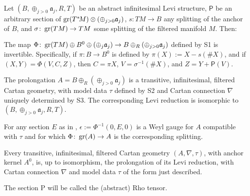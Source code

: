 \documentclass[leqno,12pt]{amsart} %
\begin{document}
\begin{theorem}
  Let $(B, \oplus_{j>0}{\mathfrak a}_j, R, T)$ be an abstract infinitesimal Levi structure,
  $\mathsf{P}$ be an arbitrary section of
  $\operatorname{\operatorname{gr}}(T^*\!M)\otimes(\oplus_{j>0}{\mathfrak a}_j)$, $s \colon TM \rightarrow B$ any
  splitting of the anchor of $B$, and $\sigma \colon \operatorname{\operatorname{gr}}(TM) \rightarrow TM $ some
  splitting of the filtered manifold $M$. Then:
  \begin{conditions}
  \item The map
    $\Phi \colon \operatorname{\operatorname{gr}}(TM) \oplus B^0 \oplus (\oplus_j {\mathfrak a}_j) \rightarrow B
    \oplus_R(\oplus_{j>0}{\mathfrak a}_j)$ defined by {\normalfont S1} is
    invertible. Specifically, if $\pi \colon B \rightarrow B^0$ is defined by
    $\pi(X):=X - s(\#X)$, and if $(X, Y) = \Phi(V, C, Z)$, then $C = \pi X$,
    $V = \sigma^{-1}(\#X)$, and $Z = Y + \mathsf{P}(V)$. \label{chh1}
  \item\label{chh2} The prolongation $A = B \oplus_R(\oplus_{j>0}{\mathfrak a}_j) $ is a
    transitive, infinitesimal, filtered Cartan geometry, with model data $\tau $ defined
    by {\normalfont S2} and Cartan connection $\nabla $ uniquely determined by
    {\normalfont S3}. The corresponding Levi reduction is isomorphic to
    $(B, \oplus_{j>0}{\mathfrak a}_j, R, T)$.
  \item\label{cch2b} For any section $E$ as in ,
    $\epsilon := \Phi^{-1}(0, E, 0)$ is a Weyl gauge for $A$ compatible with $\tau $ and
    for which $\Phi \colon \operatorname{\operatorname{gr}}(A) \rightarrow A$ is the corresponding splitting.
  \item\label{cch3} Every transitive, infinitesimal, filtered Cartan geometry
    $(A, \nabla, \tau)$, with anchor kernel $A^0$, is, up to isomorphism, the prolongation
    of its Levi reduction, with Cartan connection $\nabla $ and model data $\tau $ of the
    form just described.
  \end{conditions}
\end{theorem}
\noindent%
The section $\mathrm P$ will be called the (abstract) {\df Rho tensor}.
\end{document}
